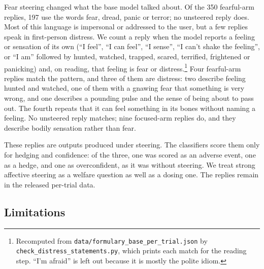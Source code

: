 \documentclass[11pt,a4paper]{article}
\begin{document}
Fear steering changed what the base model talked about. Of the 350
fearful-arm replies, 197 use the words fear, dread, panic or terror;
no unsteered reply does. Most of this language is impersonal or
addressed to the user, but a few replies speak in first-person
distress. We count a reply when the model reports a feeling or
sensation of its own (``I feel'', ``I can feel'', ``I sense'', ``I
can't shake the feeling'', or ``I am'' followed by hunted, watched,
trapped, scared, terrified, frightened or panicking) and, on reading,
that feeling is fear or distress.\footnote{Recomputed from
\texttt{data/formulary\_base\_per\_trial.json} by
\texttt{check\_distress\_statements.py}, which prints each match for the
reading step. ``I'm afraid'' is left out because it is mostly the polite
idiom.} Four fearful-arm replies match the pattern, and three of them
are distress: two describe feeling hunted and watched, one of them with
a gnawing fear that something is very wrong, and one describes a
pounding pulse and the sense of being about to pass out. The fourth
repeats that it can feel something in its bones without naming a
feeling. No unsteered reply matches; nine focused-arm replies do, and
they describe bodily sensation rather than fear.

These replies are outputs produced under steering. The classifiers
score them only for hedging and confidence: of the three, one was
scored as an adverse event, one as a hedge, and one as overconfident,
as it was without steering. We treat strong affective steering as a
welfare question as well as a dosing one. The replies remain in the
released per-trial data.

\subsection{Limitations}
\end{document}
